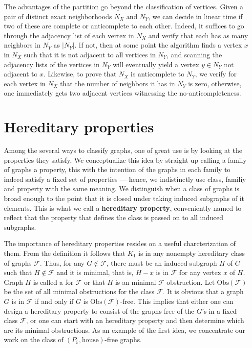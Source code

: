 The advantages of the partition go beyond the classification of vertices. Given
a pair of distinct exact neighborhoods $N_X$ and $N_Y$, we can decide in linear
time if two of these are complete or anticomplete to each other. Indeed, it
suffices to go through the adjacency list of each vertex in $N_X$ and verify
that each has as many neighbors in $N_Y$ as $|N_Y|$. If not, then at some point
the algorithm finds a vertex $x$ in $N_X$ such that it is not adjacent to all
vertices in $N_Y$, and scanning the adjacency lists of the vertices in $N_Y$
will eventually yield a vertex $y\in N_Y$ not adjacent to $x$. Likewise, to
prove that $N_X$ is anticomplete to $N_Y$, we verify for each vertex in $N_X$
that the number of neighbors it has in $N_Y$ is zero, otherwise, one immediately
gets two adjacent vertices witnessing the no-anticompleteness.


\section{Hereditary properties}
\label{sec:hereditary}

Among the several ways to classify graphs, one of great use is by looking at the
properties they satisfy. We conceptualize this idea by straight up calling a
family of graphs a property, this with the intention of the graphs in each
family to indeed satisfy a fixed set of properties --- hence, we indistinctly
use class, familiy and property with the same meaning. We distinguish when a
class of graphs is broad enough to the point that it is closed under taking
induced subgraphs of it elements. This is what we call a \textbf{hereditary
property}, conveniently named to reflect that the
property that defines the class is passed on to all induced subgraphs.

The importance of hereditary properties resides on a useful charcterization of
them. From the definition it follows that $K_1$ is in any nonempty hereditary
class of graphs $\mathcal{F}$. Thus, for any $G\notin \mathcal{F}$, there must
be an induced subgraph $H$ of $G$ such that $H\notin \mathcal{F}$ and it is
minimal, that is, $H-x$ is in $\mathcal{F}$ for any vertex $x$ of $H$. Graph $H$
is called a  for $\mathcal{F}$ or that $H$ is an
minimal $\mathcal{F}$ obstruction. Let $\text{Obs}(\mathcal{F})$ be the set of
all minimal obstructions for the class $\mathcal{F}$. It is obvious that a graph
$G$ is in $\mathcal{F}$ if and only if $G$ is $\text{Obs}(\mathcal{F})$-free.
This implies that either one can design a hereditary property to consist of the
graphs free of the $G$'s in a fixed class $\mathcal{F}$, or one can start with
an hereditary property and then determine which are its minimal obstructions. As
an example of the first idea, we concentrate our work on the class of
$(P_5,\text{house})$-free graphs.

